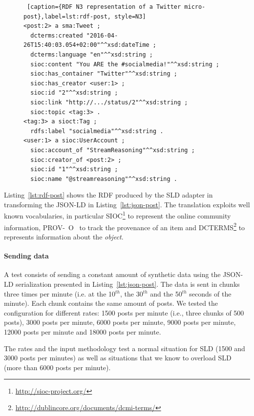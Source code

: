 \begin{figure}[ht]
\begin{minipage}{0.95\linewidth}
\begin{lstlisting} [caption={RDF N3 representation of a Twitter micro-post},label=lst:rdf-post, style=N3]
<post:2> a sma:Tweet ;
  dcterms:created "2016-04-26T15:40:03.054+02:00"^^xsd:dateTime ;
  dcterms:language "en"^^xsd:string ;
  sioc:content "You ARE the #socialmedia!"^^xsd:string ;
  sioc:has_container "Twitter"^^xsd:string ;
  sioc:has_creator <user:1> ;
  sioc:id "2"^^xsd:string ;
  sioc:link "http://.../status/2"^^xsd:string ;
  sioc:topic <tag:3> .
<tag:3> a sioct:Tag ;
  rdfs:label "socialmedia"^^xsd:string .
<user:1> a sioc:UserAccount ;
  sioc:account_of "StreamReasoning"^^xsd:string ;
  sioc:creator_of <post:2> ;
  sioc:id "1"^^xsd:string ;
  sioc:name "@streamreasoning"^^xsd:string .
\end{lstlisting}
\end{minipage}
\end{figure}

Listing~\ref{lst:rdf-post} shows the RDF produced by the SLD adapter in transforming the JSON-LD in Listing~\ref{lst:json-post}. The translation exploits well known vocabularies, in particular SIOC\footnote{\url{http://sioc-project.org/}} to represent the online community information, PROV-~O~\cite{w3c-prov-o} to track the provenance of an item and DCTERMS\footnote{\url{http://dublincore.org/documents/dcmi-terms/}} to represents information about the \textit{object}.

\paragraph{Sending data} 
A test consists of sending a constant amount of synthetic data using the JSON-LD serialization presented in Listing~\ref{lst:json-post}.
The data is sent in chunks three times per minute (i.e. at the 10$^{th}$, the 30$^{th}$ and the 50$^{th}$ seconds of the minute).  Each chunk contains the same amount of posts. We tested the configuration for different rates: 1500 posts per minute (i.e., three chunks of 500 posts), 3000 posts per minute, 6000 posts per minute, 9000 posts per minute, 12000 posts per minute and 18000 posts per minute.

The rates and the input methodology test a normal situation for SLD (1500 and 3000 posts per minutes) as well as situations that we know to overload SLD (more than 6000 posts per minute).


